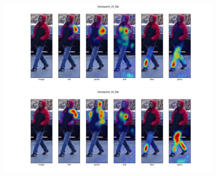 \begin{figure}
  \includegraphics[options]{img/mrtd_masking_ratio/mrtd-checkpoint_35_flat.png}\includegraphics[options]{img/mrtd_masking_ratio/mrtd-checkpoint_40_flat.png}
  
  
\end{figure}